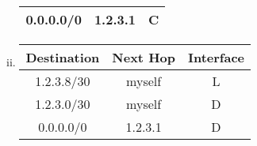 \documentclass[12pt]{article}
\begin{document}
\begin{enumerate}
\begin{enumerate}
\begin{enumerate}[(i)]
\begin{tabular}{ |c|c|c| }
             \hline
             0.0.0.0/0 & 1.2.3.1 & C \\
             \hline
            \end{tabular} 
        \item
            \begin{tabular}{ |c|c|c| } 
             \hline
             Destination & Next Hop & Interface \\ 
             \hline
             1.2.3.8/30 & myself & L \\
             \hline
             1.2.3.0/30 & myself & D \\
             \hline
             0.0.0.0/0 & 1.2.3.1 & D \\
             \hline
            \end{tabular} 
        \end{enumerate}
    \end{enumerate}
    

\end{enumerate}
\end{document}
